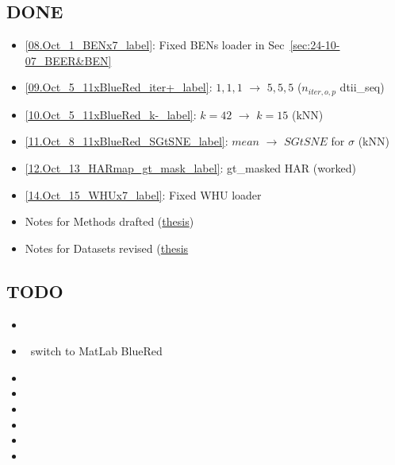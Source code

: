 

\begin{multicols}{2}
\subsection*{DONE}
\begin{itemize}
    \item \ref{08.Oct_1_BENx7_label}: Fixed BENs loader in Sec~\ref{sec:24-10-07_BEER&BEN}
    \item \ref{09.Oct_5_11xBlueRed_iter+_label}: $1,1,1$ $\rightarrow$ $5,5,5$ ($n_{iter, o, p}$ dtii\_seq)
    \item \ref{10.Oct_5_11xBlueRed_k-_label}: $k=42$ $\rightarrow$ $k=15$ (kNN)
    \item \ref{11.Oct_8_11xBlueRed_SGtSNE_label}: $mean$ $\rightarrow$ $SGtSNE$ for $\sigma$ (kNN)
    \item \ref{12.Oct_13_HARmap_gt_mask_label}: gt\_masked HAR (worked)
    \item \ref{14.Oct_15_WHUx7_label}: Fixed WHU loader
    \item Notes for Methods drafted (\href{https://gitlab.oit.duke.edu/jw853/clustering4hsi_thesis}{thesis})
    \item Notes for Datasets revised (\href{https://gitlab.oit.duke.edu/jw853/clustering4hsi_thesis}{thesis}
\end{itemize}

\subsection*{TODO}
\begin{itemize}
    \item {}
    \item \checkmark \ switch to MatLab BlueRed
    \item {}
    \item 
    \item {}
    \item 
    \item 
    \item {}
\end{itemize}
\end{multicols}

\newpage

